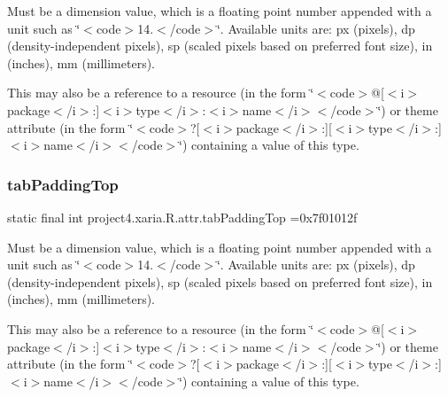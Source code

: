 Must be a dimension value, which is a floating point number appended with a unit such as \char`\"{}$<$code$>$14.\+5sp$<$/code$>$\char`\"{}. Available units are\+: px (pixels), dp (density-\/independent pixels), sp (scaled pixels based on preferred font size), in (inches), mm (millimeters). 

This may also be a reference to a resource (in the form \char`\"{}$<$code$>$@\mbox{[}$<$i$>$package$<$/i$>$\+:\mbox{]}$<$i$>$type$<$/i$>$\+:$<$i$>$name$<$/i$>$$<$/code$>$\char`\"{}) or theme attribute (in the form \char`\"{}$<$code$>$?\mbox{[}$<$i$>$package$<$/i$>$\+:\mbox{]}\mbox{[}$<$i$>$type$<$/i$>$\+:\mbox{]}$<$i$>$name$<$/i$>$$<$/code$>$\char`\"{}) containing a value of this type. \mbox{\label{classproject4_1_1xaria_1_1R_1_1attr_ae8e184d46ffdbd6b10529cb6e73272f1}} 
\subsubsection{\texorpdfstring{tab\+Padding\+Top}{tabPaddingTop}}
{\footnotesize\ttfamily static final int project4.\+xaria.\+R.\+attr.\+tab\+Padding\+Top =0x7f01012f\hspace{0.3cm}{\ttfamily [static]}}

Must be a dimension value, which is a floating point number appended with a unit such as \char`\"{}$<$code$>$14.\+5sp$<$/code$>$\char`\"{}. Available units are\+: px (pixels), dp (density-\/independent pixels), sp (scaled pixels based on preferred font size), in (inches), mm (millimeters). 

This may also be a reference to a resource (in the form \char`\"{}$<$code$>$@\mbox{[}$<$i$>$package$<$/i$>$\+:\mbox{]}$<$i$>$type$<$/i$>$\+:$<$i$>$name$<$/i$>$$<$/code$>$\char`\"{}) or theme attribute (in the form \char`\"{}$<$code$>$?\mbox{[}$<$i$>$package$<$/i$>$\+:\mbox{]}\mbox{[}$<$i$>$type$<$/i$>$\+:\mbox{]}$<$i$>$name$<$/i$>$$<$/code$>$\char`\"{}) containing a value of this type. \mbox{\label{classproject4_1_1xaria_1_1R_1_1attr_a3136fb05e31f14d3a1664eaa7ff355b1}} 
